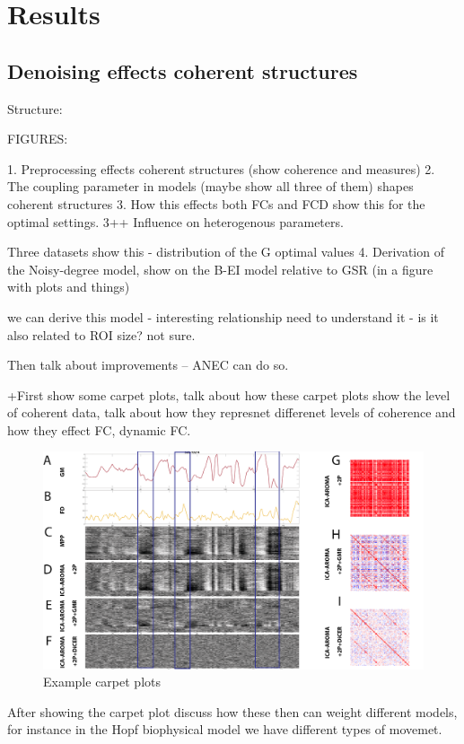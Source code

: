 \documentclass[oneside]{zHenriquesLab-StyleBioRxiv}
\begin{document}
\section*{Results}
\subsection*{Denoising effects coherent structures}
Structure:

FIGURES:

1. Preprocessing effects coherent structures (show coherence and measures)
2. The coupling parameter in models (maybe show all three of them) shapes coherent structures
3. How this effects both FCs and FCD show this for the optimal settings.
3++ Influence on heterogenous parameters.

Three datasets show this - distribution of the G optimal values
4. Derivation of the Noisy-degree model, show on the B-EI model relative to GSR (in a figure with plots and things)

we can derive this model - interesting relationship need to understand it - is it also related to ROI size? not sure.

Then talk about improvements -- ANEC can do so. 


+First show some carpet plots, talk about how these carpet plots show the level of coherent data, talk about how they represnet differenet levels of coherence and how they effect FC, dynamic FC.

\begin{figure}[ht!]
\includegraphics[width=1\textwidth]{figs/figure_example.png}
\caption{Example carpet plots}
\end{figure}

After showing the carpet plot discuss how these then can weight different models, for instance in the Hopf biophysical model we have different types of movemet.
\end{document}
